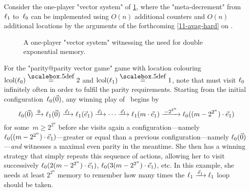 
\begin{example}
  Consider the one-player "vector system" of \cref{11-fig:finitemem},
  where the "meta-decrement" from~$\ell_1$ to~$\ell_0$ can be
  implemented using $O(n)$ additional counters and $O(n)$ additional
  locations by the arguments of the forthcoming \cref{11-avag-hard}
  on .
  
  \begin{figure}[htbp]
    \centering
  \caption{A one-player "vector system"
  witnessing the need for double exponential memory.}\label{11-fig:finitemem}
  \end{figure}

  For the "parity@parity vector game" game with location colouring
  $\lcol(\loc_0)\eqdef 2$ and $\lcol(\loc_1)\eqdef 1$, note that \Eve
  must visit $\ell_0$ infinitely often in order to fulfil the parity
  requirements.  Starting from the initial
  configuration~$\ell_0(\vec 0)$, any winning play of \Eve\ begins
  by \begin{equation*} \loc_0(\vec 0)\step{0}\loc_1(\vec 0)\step{\vec
      e_1}\loc_1(\vec e_1)\step{\vec e_1}\cdots\step{\vec
      e_1}\loc_1(m\cdot\vec
    e_1)\mstep{-2^{2^n}}\loc_0((m-2^{2^n})\cdot\vec
    e_1) \end{equation*} for some~$m\geq 2^{2^n}$ before she visits
  again a
  configuration---namely~$\ell_0((m-2^{2^n})\cdot\vec e_1)$---greater
  or equal than a previous configuration---namely
  $\ell_0(\vec 0)$---\emph{and} witnesses a maximal even parity in the
  meantime.  She then has a winning strategy that simply repeats this
  sequence of actions, allowing her to visit successively
  $\ell_0(2(m-2^{2^n})\cdot\vec e_1)$,
  $\ell_0(3(m-2^{2^n})\cdot\vec e_1)$, etc.  In this example, she
  needs at least $2^{2^n}$ memory to remember how many times the
  $\loc_1\step{\vec e_1}\loc_1$ loop should be taken.
\end{example}

